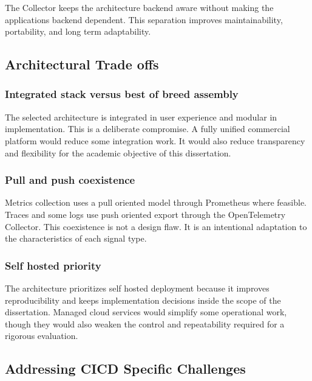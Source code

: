The Collector keeps the architecture backend aware without making the applications backend dependent. This separation improves maintainability, portability, and long term adaptability.

\subsection{Architectural Trade offs}
\label{subsec:architectural_tradeoffs}

\subsubsection{Integrated stack versus best of breed assembly}
\label{subsubsec:monolithic_vs_distributed}

The selected architecture is integrated in user experience and modular in implementation. This is a deliberate compromise. A fully unified commercial platform would reduce some integration work. It would also reduce transparency and flexibility for the academic objective of this dissertation.

\subsubsection{Pull and push coexistence}
\label{subsubsec:pull_vs_push}

Metrics collection uses a pull oriented model through Prometheus where feasible. Traces and some logs use push oriented export through the OpenTelemetry Collector. This coexistence is not a design flaw. It is an intentional adaptation to the characteristics of each signal type.

\subsubsection{Self hosted priority}
\label{subsubsec:selfhosted_vs_cloud}

The architecture prioritizes self hosted deployment because it improves reproducibility and keeps implementation decisions inside the scope of the dissertation. Managed cloud services would simplify some operational work, though they would also weaken the control and repeatability required for a rigorous evaluation.

\subsection{Addressing \texorpdfstring{\gls{CICD}}{CI/CD} Specific Challenges}
\label{subsec:cicd_challenges}

